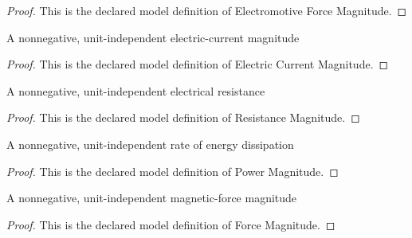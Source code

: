 \begin{proof}
  This is the declared model definition of Electromotive Force Magnitude.
\end{proof}
\begin{definition}
  \label{def:physics:phyx-mini-0919:phyxminiproblems-problemphyxmini0919-electriccurrentmagnitude}
  A nonnegative, unit-independent electric-current magnitude
\end{definition}
\begin{proof}
  This is the declared model definition of Electric Current Magnitude.
\end{proof}
\begin{definition}
  \label{def:physics:phyx-mini-0919:phyxminiproblems-problemphyxmini0919-resistancemagnitude}
  A nonnegative, unit-independent electrical resistance
\end{definition}
\begin{proof}
  This is the declared model definition of Resistance Magnitude.
\end{proof}
\begin{definition}
  \label{def:physics:phyx-mini-0919:phyxminiproblems-problemphyxmini0919-powermagnitude}
  A nonnegative, unit-independent rate of energy dissipation
\end{definition}
\begin{proof}
  This is the declared model definition of Power Magnitude.
\end{proof}
\begin{definition}
  \label{def:physics:phyx-mini-0919:phyxminiproblems-problemphyxmini0919-forcemagnitude}
  A nonnegative, unit-independent magnetic-force magnitude
\end{definition}
\begin{proof}
  This is the declared model definition of Force Magnitude.
\end{proof}
